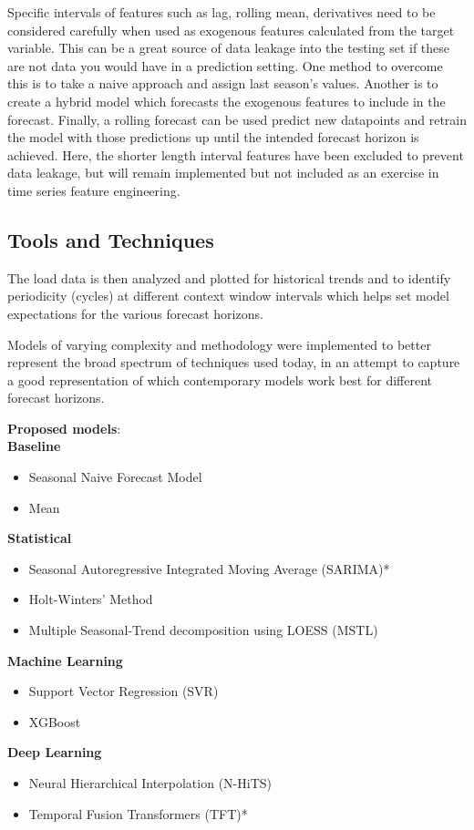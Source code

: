 \documentclass[sigconf]{acmart}
\begin{document}
Specific intervals of features such as lag, rolling mean, derivatives need to be considered carefully when used as exogenous features calculated from the target variable. This can be a great source of data leakage into the testing set if these are not data you would have in a prediction setting. One method to overcome this is to take a naive approach and assign last season's values. Another is to create a hybrid model which forecasts the exogenous features to include in the forecast. Finally, a rolling forecast can be used predict new datapoints and retrain the model with those predictions up until the intended forecast horizon is achieved. Here, the shorter length interval features have been excluded to prevent data leakage, but will remain implemented but not included as an exercise in time series feature engineering.

  \subsection{Tools and Techniques}
    The load data is then analyzed and plotted for historical trends and to identify periodicity (cycles) at different context window intervals which helps set model expectations for the various forecast horizons. 
    
    Models of varying complexity and methodology were implemented to better represent the broad spectrum of techniques used today, in an attempt to capture a good representation of which contemporary models work best for different forecast horizons. 

\textbf{Proposed models}:
\\
\textbf{Baseline}
\begin{itemize}
    \item{Seasonal Naive Forecast Model}
    \item{Mean}
\end{itemize}
\textbf{Statistical}
\begin{itemize}
    \item{Seasonal Autoregressive Integrated Moving Average (SARIMA)*}
    \item{Holt-Winters' Method}
    \item{Multiple Seasonal-Trend decomposition using LOESS (MSTL)}
\end{itemize}
\textbf{Machine Learning}
\begin{itemize}
    \item{Support Vector Regression (SVR)}
    \item{XGBoost}
\end{itemize}
\textbf{Deep Learning}
\begin{itemize}
    \item{Neural Hierarchical Interpolation (N-HiTS)}
    \item{Temporal Fusion Transformers (TFT)*}
\end{itemize}
\end{document}
